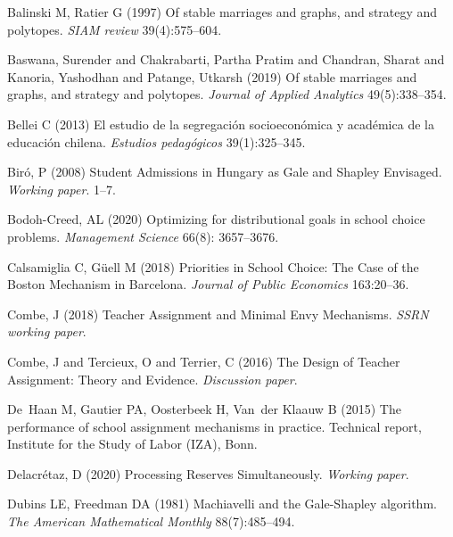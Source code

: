 \begin{thebibliography}{36}
Balinski M, Ratier G (1997) Of stable marriages and graphs, and strategy and
  polytopes. \emph{SIAM review} 39(4):575--604.

  Baswana, Surender and Chakrabarti, Partha Pratim and Chandran, Sharat and Kanoria, Yashodhan and Patange, Utkarsh (2019) Of stable marriages and graphs, and strategy and
    polytopes. \emph{Journal of Applied Analytics} 49(5):338--354.

Bellei C (2013) El estudio de la segregaci{\'o}n socioecon{\'o}mica y
  acad{\'e}mica de la educaci{\'o}n chilena. \emph{Estudios pedag{\'o}gicos} 39(1):325--345.

  Bir\'o, P (2008) Student Admissions in Hungary as Gale and Shapley Envisaged. \emph{Working paper}. 1--7.

  Bodoh-Creed, AL (2020) Optimizing for distributional goals in school choice problems. \emph{Management Science} 66(8): 3657--3676.

Calsamiglia C, G{\"u}ell M (2018) Priorities in School Choice: The Case of the Boston Mechanism in Barcelona. \emph{Journal of Public Economics} 163:20--36.

Combe, J (2018) Teacher Assignment and Minimal Envy Mechanisms. \emph{SSRN working paper}.

Combe, J and Tercieux, O and Terrier, C (2016) The Design of Teacher Assignment: Theory and Evidence.
  \emph{Discussion paper}.


De~Haan M, Gautier PA, Oosterbeek H, Van~der Klaauw B (2015) The performance of
  school assignment mechanisms in practice. Technical report, Institute for the
  Study of Labor (IZA), Bonn.

 Delacr\'etaz, D (2020) Processing Reserves Simultaneously.
\emph{Working paper}.


Dubins LE, Freedman DA (1981) Machiavelli and the Gale-Shapley algorithm.
  \emph{The American Mathematical Monthly} 88(7):485--494.


\end{thebibliography}
